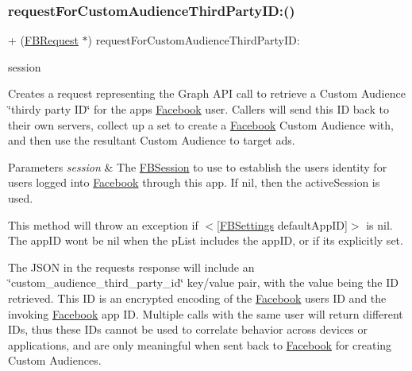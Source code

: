 \subsubsection{\texorpdfstring{request\+For\+Custom\+Audience\+Third\+Party\+I\+D\+:()}{requestForCustomAudienceThirdPartyID:()}\hspace{0.1cm}{\footnotesize\ttfamily [5/5]}}
{\footnotesize\ttfamily + (\hyperlink{interfaceFBRequest}{F\+B\+Request} $\ast$) request\+For\+Custom\+Audience\+Third\+Party\+I\+D\+: \begin{DoxyParamCaption}\item[{(\hyperlink{interfaceFBSession}{F\+B\+Session} $\ast$)}]{session }\end{DoxyParamCaption}}

Creates a request representing the Graph A\+PI call to retrieve a Custom Audience \char`\"{}thirdy party I\+D\char`\"{} for the app\textquotesingle{}s \hyperlink{interfaceFacebook}{Facebook} user. Callers will send this ID back to their own servers, collect up a set to create a \hyperlink{interfaceFacebook}{Facebook} Custom Audience with, and then use the resultant Custom Audience to target ads.


\begin{DoxyParams}{Parameters}
{\em session} & The \hyperlink{interfaceFBSession}{F\+B\+Session} to use to establish the user\textquotesingle{}s identity for users logged into \hyperlink{interfaceFacebook}{Facebook} through this app. If {\ttfamily nil}, then the active\+Session is used.\\
\hline
\end{DoxyParams}
This method will throw an exception if $<$\mbox{[}\hyperlink{interfaceFBSettings}{F\+B\+Settings} default\+App\+ID\mbox{]}$>$ is {\ttfamily nil}. The app\+ID won\textquotesingle{}t be nil when the p\+List includes the app\+ID, or if it\textquotesingle{}s explicitly set.

The J\+S\+ON in the request\textquotesingle{}s response will include an \char`\"{}custom\+\_\+audience\+\_\+third\+\_\+party\+\_\+id\char`\"{} key/value pair, with the value being the ID retrieved. This ID is an encrypted encoding of the \hyperlink{interfaceFacebook}{Facebook} user\textquotesingle{}s ID and the invoking \hyperlink{interfaceFacebook}{Facebook} app ID. Multiple calls with the same user will return different I\+Ds, thus these I\+Ds cannot be used to correlate behavior across devices or applications, and are only meaningful when sent back to \hyperlink{interfaceFacebook}{Facebook} for creating Custom Audiences.

